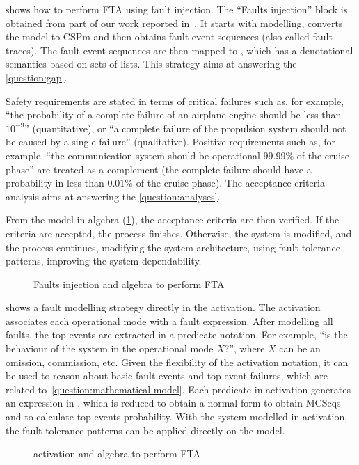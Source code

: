  shows how to perform \ac{FTA} using fault injection.
The ``Faults injection'' block is obtained from part of our work reported in~\cite{DM2012,Didier2012}.
It starts with \simulink modelling, converts the model to \ac{CSPm} and then obtains fault event sequences (also called fault traces).
The fault event sequences are then mapped to , which has a denotational semantics based on sets of lists.
This strategy aims at answering the \cref{question:gap}.

Safety requirements are stated in terms of critical failures such as, for example, ``the probability of a complete failure of an airplane engine should be less than $10^{-9}$'' (quantitative), or ``a complete failure of the propulsion system should not be caused by a single failure'' (qualitative).
Positive requirements such as, for example, ``the communication system should be operational $99.99\%$ of the cruise phase'' are treated as a complement (the complete failure should have a probability in less than $0.01\%$ of the cruise phase).
The acceptance criteria analysis aims at answering the \ref{question:analyses}.

From the model in \ac{algebra} (\cref{fig:strategy-overview-csp}), the acceptance criteria are then verified.
If the criteria are accepted, the process finishes.
Otherwise, the system is modified, and the process continues, modifying the system architecture, using fault tolerance patterns, improving the system dependability.
%
\begin{figure}[htb]
  \centering
  \caption{Faults injection and \ac{algebra} to perform \ac{FTA}}
  \label{fig:strategy-overview-csp}
\end{figure}

 shows a fault modelling strategy directly in the \ac{activation}.
The \ac{activation} associates each operational mode with a fault expression.
After modelling all faults, the top events are extracted in a predicate notation. 
For example, ``is the behaviour of the system in the operational mode $X$?'', where $X$ can be an omission, commission, etc.
Given the flexibility of the \ac{activation} notation, it can be used to reason about basic fault events and top-event failures, which are related to~\ref{question:mathematical-model}.
Each predicate in \ac{activation} generates an expression in , which is reduced to obtain a normal form to obtain \acp{MCSeq} and to calculate top-events probability.
With the system modelled in \ac{activation}, the fault tolerance patterns can be applied directly on the model.
%
\begin{figure}[htb]
  \centering
  \caption{\Ac{activation} and \ac{algebra} to perform \ac{FTA}}
  \label{fig:strategy-overview-activation}
\end{figure}

